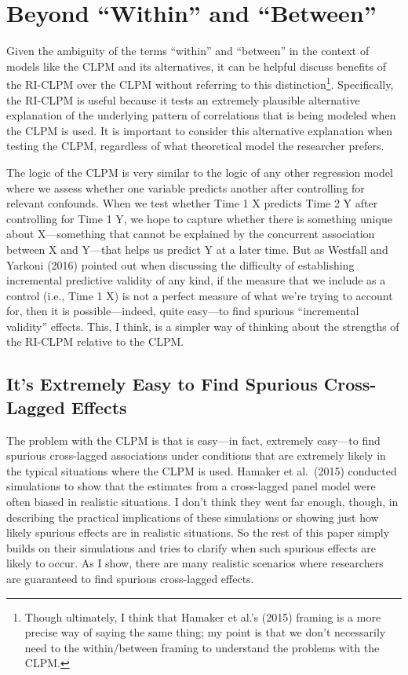 \documentclass[
  english,
  man,floatsintext]{apa6}
\begin{document}
\hypertarget{beyond-within-and-between}{%
\section{Beyond ``Within'' and ``Between''}\label{beyond-within-and-between}}

Given the ambiguity of the terms ``within'' and ``between'' in the context of models like the CLPM and its alternatives, it can be helpful discuss benefits of the RI-CLPM over the CLPM without referring to this distinction\footnote{Though ultimately, I think that Hamaker et al.'s (2015) framing is a more precise way of saying the same thing; my point is that we don't necessarily need to the within/between framing to understand the problems with the CLPM.}. Specifically, the RI-CLPM is useful because it tests an extremely plausible alternative explanation of the underlying pattern of correlations that is being modeled when the CLPM is used. It is important to consider this alternative explanation when testing the CLPM, regardless of what theoretical model the researcher prefers.

The logic of the CLPM is very similar to the logic of any other regression model where we assess whether one variable predicts another after controlling for relevant confounds. When we test whether Time 1 X predicts Time 2 Y after controlling for Time 1 Y, we hope to capture whether there is something unique about X---something that cannot be explained by the concurrent association between X and Y---that helps us predict Y at a later time. But as Westfall and Yarkoni (2016) pointed out when discussing the difficulty of establishing incremental predictive validity of any kind, if the measure that we include as a control (i.e., Time 1 X) is not a perfect measure of what we're trying to account for, then it is possible---indeed, quite easy---to find spurious ``incremental validity'' effects. This, I think, is a simpler way of thinking about the strengths of the RI-CLPM relative to the CLPM.

\hypertarget{its-extremely-easy-to-find-spurious-cross-lagged-effects}{%
\subsection{It's Extremely Easy to Find Spurious Cross-Lagged Effects}\label{its-extremely-easy-to-find-spurious-cross-lagged-effects}}

The problem with the CLPM is that is easy---in fact, extremely easy---to find spurious cross-lagged associations under conditions that are extremely likely in the typical situations where the CLPM is used. Hamaker et al.~(2015) conducted simulations to show that the estimates from a cross-lagged panel model were often biased in realistic situations. I don't think they went far enough, though, in describing the practical implications of these simulations or showing just how likely spurious effects are in realistic situations. So the rest of this paper simply builds on their simulations and tries to clarify when such spurious effects are likely to occur. As I show, there are many realistic scenarios where researchers are guaranteed to find spurious cross-lagged effects.
\end{document}
